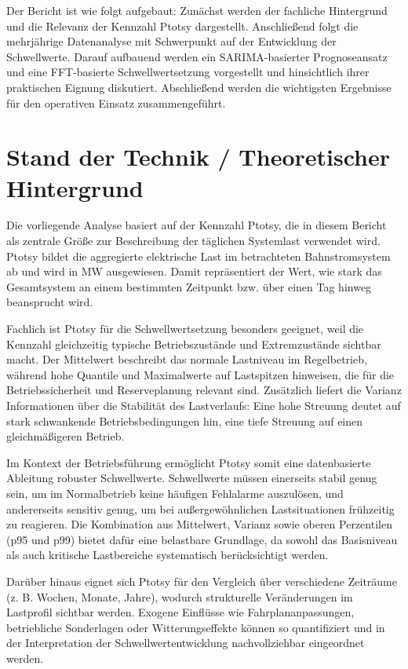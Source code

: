 \documentclass[12pt,oneside]{article}
\begin{document}
Der Bericht ist wie folgt aufgebaut: Zunächst werden der fachliche Hintergrund
und die Relevanz der Kennzahl Ptotsy dargestellt. Anschließend folgt die
mehrjährige Datenanalyse mit Schwerpunkt auf der Entwicklung der
Schwellwerte. Darauf aufbauend werden ein SARIMA-basierter Prognoseansatz und
eine FFT-basierte Schwellwertsetzung vorgestellt und hinsichtlich ihrer
praktischen Eignung diskutiert. Abschließend werden die wichtigsten Ergebnisse
für den operativen Einsatz zusammengeführt.

\section{Stand der Technik / Theoretischer Hintergrund}
\label{sec:stand}
Die vorliegende Analyse basiert auf der Kennzahl Ptotsy, die in diesem Bericht als zentrale Größe zur Beschreibung der täglichen Systemlast verwendet wird. Ptotsy bildet die aggregierte elektrische Last im betrachteten Bahnstromsystem ab und wird in MW ausgewiesen. Damit repräsentiert der Wert, wie stark das Gesamtsystem an einem bestimmten Zeitpunkt bzw. über einen Tag hinweg beansprucht wird.

Fachlich ist Ptotsy für die Schwellwertsetzung besonders geeignet, weil die Kennzahl gleichzeitig typische Betriebszustände und Extremzustände sichtbar macht. Der Mittelwert beschreibt das normale Lastniveau im Regelbetrieb, während hohe Quantile und Maximalwerte auf Lastspitzen hinweisen, die für die Betriebssicherheit und Reserveplanung relevant sind. Zusätzlich liefert die Varianz Informationen über die Stabilität des Lastverlaufs: Eine hohe Streuung deutet auf stark schwankende Betriebsbedingungen hin, eine tiefe Streuung auf einen gleichmäßigeren Betrieb.

Im Kontext der Betriebsführung ermöglicht Ptotsy somit eine datenbasierte Ableitung robuster Schwellwerte. Schwellwerte müssen einerseits stabil genug sein, um im Normalbetrieb keine häufigen Fehlalarme auszulösen, und andererseits sensitiv genug, um bei außergewöhnlichen Lastsituationen frühzeitig zu reagieren. Die Kombination aus Mittelwert, Varianz sowie oberen Perzentilen (p95 und p99) bietet dafür eine belastbare Grundlage, da sowohl das Basisniveau als auch kritische Lastbereiche systematisch berücksichtigt werden.

Darüber hinaus eignet sich Ptotsy für den Vergleich über verschiedene Zeiträume (z. B. Wochen, Monate, Jahre), wodurch strukturelle Veränderungen im Lastprofil sichtbar werden. Exogene Einflüsse wie Fahrplananpassungen, betriebliche Sonderlagen oder Witterungseffekte können so quantifiziert und in der Interpretation der Schwellwertentwicklung nachvollziehbar eingeordnet werden.
\end{document}
